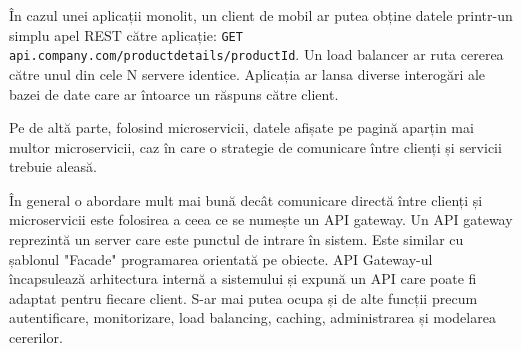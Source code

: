 \documentclass[12pt, a4paper, oneside, romanian]{teza-upb}
\begin{document}
În cazul unei aplicații monolit, un client de mobil ar putea obține datele printr-un simplu apel REST către aplicație: \texttt{GET api.company.com/productdetails/productId}. Un load balancer ar ruta cererea către unul din cele N servere identice. Aplicația ar lansa diverse interogări ale bazei de date care ar întoarce un răspuns către client. 

Pe de altă parte, folosind microservicii, datele afișate pe pagină aparțin mai multor microservicii, caz în care o strategie de comunicare între clienți și servicii trebuie aleasă. 

În general o abordare mult mai bună decât comunicare directă între clienți și microservicii este folosirea a ceea ce se numește un API gateway. Un API gateway reprezintă un server care este punctul de intrare în sistem. Este similar cu șablonul "Facade" programarea orientată pe obiecte. API Gateway-ul încapsulează arhitectura internă a sistemului și expună un API care poate fi adaptat pentru fiecare client. S-ar mai putea ocupa și de alte funcții precum autentificare, monitorizare, load balancing, caching, administrarea și modelarea cererilor. 
\end{document}

